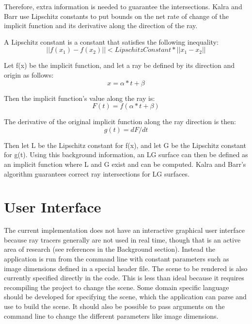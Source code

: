 \documentclass[conference]{acmsiggraph}
\begin{document}
Therefore, extra information is needed to guarantee the intersections.
Kalra and Barr use Lipschitz constants to put bounds
on the net rate of change of the implicit function and its derivative along
the direction of the ray.

A Lipschitz constant is a constant that satisfies the following inequality:
\begin{equation}
||f(x_1) - f(x_2)|| < LipschitzConstant * ||x_1 - x_2||
\end{equation}

Let f(x) be the implicit function, and let a ray be defined by its direction 
and origin as follows:
\begin{equation}
x = \alpha * t + \beta
\end{equation}

Then the implicit function's value along the ray is:
\begin{equation}
F(t) = f(\alpha * t + \beta)
\end{equation}

The derivative of the original implicit function along the ray direction is 
then:
\begin{equation}
g(t) = dF/dt
\end{equation}

Then let L be the Lipschitz constant for f(x), and let G be the Lipschitz
constant for g(t).  Using this background information, an LG surface can
then be defined as an implicit function where L and G exist and can be
computed.  Kalra and Barr's algorithm guarantees correct ray intersections
for LG surfaces.

\section{User Interface}

The current implementation does not have an interactive graphical user 
interface because ray tracers generally are not used in real time,
though that is an active area of research (see references in the Background
section).  Instead the application is run from the command line with constant 
parameters such as image dimensions defined in a special header file.
The scene to be rendered is also currently specified directly in the 
code.  This is less than ideal because it requires recompiling the project to 
change the scene.  Some domain specific language should be developed
for specifying the scene, which the application can parse and
use to build the scene.  It should also be possible to pass arguments
on the command line to change the different parameters like
image dimensions.
\end{document}
